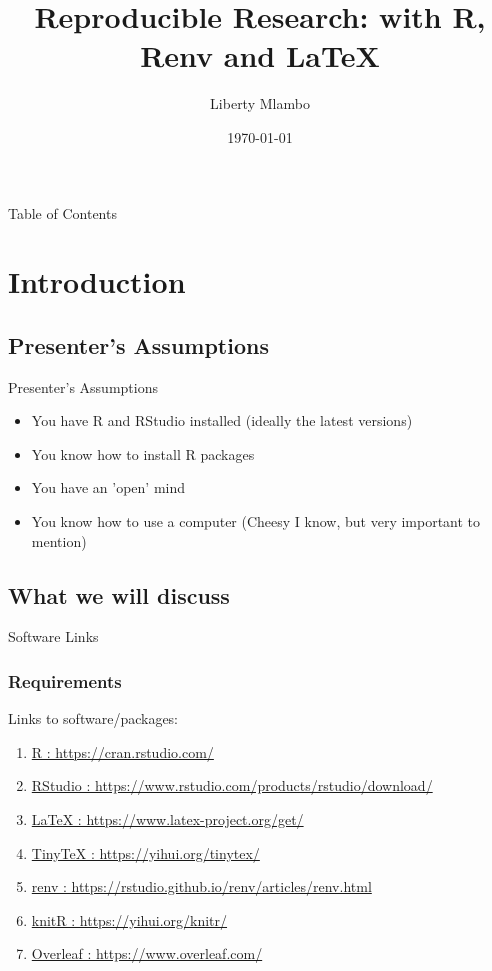 \documentclass[fleqn]{beamer}\usepackage[]{graphicx}\usepackage[]{color}
\title{Reproducible Research: with R, Renv and \LaTeX}
\author{Liberty Mlambo}
\institute[SB Stats Group]{ Research Assistant:\\ University of Nottingham}
\date{\today}
\begin{document}
\begin{frame}
  \titlepage
\end{frame}

\begin{frame}{Table of Contents}
  \tableofcontents
\end{frame}

\section{Introduction}
\subsection{Presenter's Assumptions}
\begin{frame}{Presenter's Assumptions}
\begin{itemize}
\item You have R and RStudio installed (ideally the latest versions)
\item You know how to install R packages
\item You have an 'open' mind
\item You know how to use a computer (Cheesy I know, but very important to mention)
\end{itemize}
\end{frame}


\subsection{What we will discuss}
\begin{frame}{Software Links}
  \frametitle{Requirements}
  Links to software/packages:
  \begin{enumerate}%
    \item \href{https://cran.rstudio.com/}{R : https://cran.rstudio.com/}
    \item \href{https://www.rstudio.com/products/rstudio/download/}{RStudio : https://www.rstudio.com/products/rstudio/download/}
    \item \href{https://www.latex-project.org/get/}{\LaTeX{} : https://www.latex-project.org/get/}
    \item \href{https://yihui.org/tinytex/}{TinyTeX : https://yihui.org/tinytex/}
    \item \href{https://rstudio.github.io/renv/articles/renv.html}{renv : https://rstudio.github.io/renv/articles/renv.html}
    \item \href{https://yihui.org/knitr/}{knitR : https://yihui.org/knitr/}
    \item \href{https://www.overleaf.com/}{Overleaf : https://www.overleaf.com/}
  \end{enumerate}
\end{frame}
\end{document}
